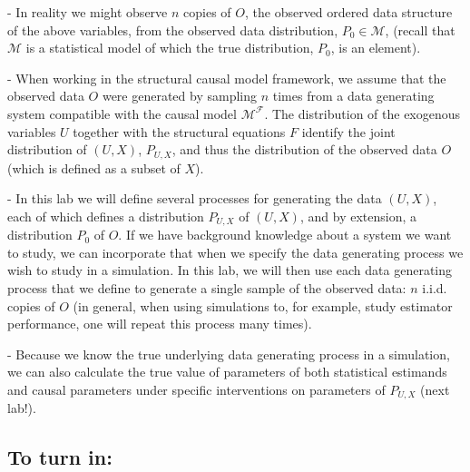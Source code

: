 \documentclass{exam}
\newenvironment{packed_item}{
\begin{itemize}
 \setlength{\itemsep}{0pt}
  \setlength{\parskip}{0pt}
  \setlength{\parsep}{0pt}
}{\end{itemize}}
\begin{document}
\begin{packed_item}
\item[-] In reality we might observe $n$ copies of $O$, the observed ordered data structure of the above variables, from the observed data distribution, $P_{0}\in \mathcal{M}$, (recall that $\mathcal{M}$ is a statistical model of which the true distribution, $P_{0}$, is an element). 
\item[-] When working in the structural causal model framework, we assume that the observed data $O$ were generated by sampling $n$ times from a data generating system compatible with the causal model $\mathcal{M^F}$. The distribution of the exogenous variables $U$ together with the structural equations $F$ identify the joint distribution of $(U,X)$, $P_{U,X}$, and thus the distribution of the observed data $O$ (which is defined as a subset of $X$). 
\item[-] In this lab we will define several processes for generating the data $(U,X)$, each of which defines a distribution $P_{U,X}$ of $(U,X)$, and by extension, a distribution $P_0$ of $O$. If we have background knowledge about a system we want to study, we can incorporate that when we specify the data generating process we wish to study in a simulation. In this lab, we will then use each data generating process that we define to generate a single sample of the observed data: $n$ i.i.d. copies of $O$ (in general, when using simulations to, for example, study estimator performance, one will repeat this process many times). 
\item[-] Because we know the true underlying data generating process in a simulation, we can also calculate the true value of parameters of both statistical estimands and causal parameters under specific interventions on parameters of $P_{U,X}$ (next lab!).
\end{packed_item}

\subsection{To turn in:}
\end{document}
